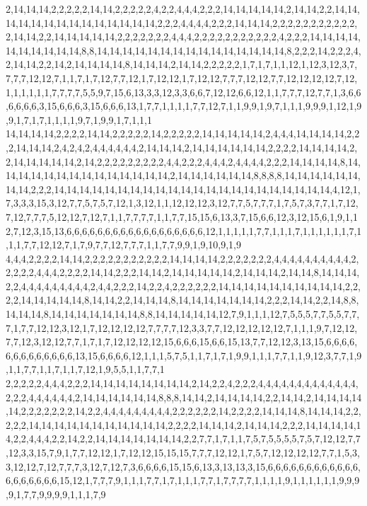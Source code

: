 2,14,14,14,2,2,2,2,2,14,14,2,2,2,2,2,4,2,2,4,4,4,2,2,2,14,14,14,14,14,2,14,14,2,2,14,14,14,14,14,14,14,14,14,14,14,14,14,14,2,2,2,4,4,4,4,2,2,2,14,14,14,2,2,2,2,2,2,2,2,2,2,2,2,14,14,2,2,14,14,14,14,14,2,2,2,2,2,2,2,4,4,4,2,2,2,2,2,2,2,2,2,2,2,4,2,2,2,14,14,14,14,14,14,14,14,14,14,8,8,14,14,14,14,14,14,14,14,14,14,14,14,14,14,14,8,2,2,2,14,2,2,2,4,2,14,14,2,2,14,2,14,14,14,14,8,14,14,14,2,14,14,2,2,2,2,2,1,7,1,7,1,1,12,1,12,3,12,3,7,7,7,7,12,12,7,1,1,7,1,7,12,7,7,12,1,7,12,12,1,7,12,12,7,7,7,12,12,7,7,12,12,12,12,7,12,1,1,1,1,1,1,7,7,7,7,5,5,9,7,15,6,13,3,3,12,3,3,6,6,7,12,12,6,6,12,1,1,7,7,7,12,7,7,1,3,6,6,6,6,6,6,3,15,6,6,6,3,15,6,6,6,13,1,7,7,1,1,1,1,7,7,12,7,1,1,9,9,1,9,7,1,1,1,9,9,9,1,12,1,9,9,1,7,1,7,1,1,1,1,9,7,1,9,9,1,7,1,1,1
14,14,14,14,2,2,2,2,14,14,2,2,2,2,2,14,2,2,2,2,2,14,14,14,14,14,2,4,4,4,14,14,14,14,2,2,2,14,14,14,2,4,2,4,2,4,4,4,4,4,4,2,14,14,14,2,14,14,14,14,14,14,2,2,2,2,14,14,14,14,2,2,14,14,14,14,14,2,14,2,2,2,2,2,2,2,2,2,4,4,2,2,2,4,4,4,2,4,4,4,4,2,2,2,14,14,14,14,8,14,14,14,14,14,14,14,14,14,14,14,14,14,14,2,14,14,14,14,14,14,8,8,8,8,14,14,14,14,14,14,14,14,2,2,2,14,14,14,14,14,14,14,14,14,14,14,14,14,14,14,14,14,14,14,14,14,14,4,12,1,7,3,3,3,15,3,12,7,7,5,7,5,7,12,1,3,12,1,1,12,12,12,3,12,7,7,5,7,7,7,1,7,5,7,3,7,7,1,7,12,7,12,7,7,7,5,12,12,7,12,7,1,1,7,7,7,7,1,1,7,7,15,15,6,13,3,7,15,6,6,12,3,12,15,6,1,9,1,12,7,12,3,15,13,6,6,6,6,6,6,6,6,6,6,6,6,6,6,6,6,6,6,12,1,1,1,1,1,7,7,1,1,1,7,1,1,1,1,1,1,7,1,1,1,7,7,12,12,7,1,7,9,7,7,12,7,7,7,1,1,7,7,9,9,1,9,10,9,1,9
4,4,4,2,2,2,2,14,14,2,2,2,2,2,2,2,2,2,2,2,14,14,14,14,2,2,2,2,2,2,2,4,4,4,4,4,4,4,4,4,4,2,2,2,2,2,4,4,4,2,2,2,2,14,14,2,2,2,14,14,2,14,14,14,14,14,2,14,14,14,2,14,14,8,14,14,14,2,2,4,4,4,4,4,4,4,4,4,2,4,4,2,2,2,14,2,2,4,2,2,2,2,2,2,14,14,14,14,14,14,14,14,14,14,2,2,2,2,14,14,14,14,14,8,14,14,2,2,14,14,14,8,14,14,14,14,14,14,14,2,2,2,14,14,2,2,14,8,8,14,14,14,8,14,14,14,14,14,14,14,8,8,14,14,14,14,14,12,7,9,1,1,1,12,7,5,5,5,7,7,5,5,7,7,7,1,7,7,12,12,3,12,1,7,12,12,12,12,7,7,7,7,12,3,3,7,7,12,12,12,12,12,7,1,1,1,9,7,12,12,7,7,12,3,12,12,7,7,1,7,1,7,12,12,12,12,15,6,6,6,15,6,6,15,13,7,7,12,12,3,13,15,6,6,6,6,6,6,6,6,6,6,6,6,6,13,15,6,6,6,6,12,1,1,1,5,7,5,1,1,7,1,7,1,9,9,1,1,1,7,7,1,1,9,12,3,7,7,1,9,1,1,7,7,1,1,7,1,1,7,12,1,9,5,5,1,1,7,7,1
2,2,2,2,2,4,4,4,2,2,2,14,14,14,14,14,14,14,14,2,14,2,2,4,2,2,2,4,4,4,4,4,4,4,4,4,4,4,4,4,2,2,2,4,4,4,4,4,4,2,14,14,14,14,14,14,8,8,8,14,14,2,14,14,14,14,2,2,14,14,2,14,14,14,14,14,2,2,2,2,2,2,2,14,2,2,4,4,4,4,4,4,4,4,4,2,2,2,2,2,2,14,2,2,2,2,14,14,14,8,14,14,14,2,2,2,2,2,14,14,14,14,14,14,14,14,14,14,14,2,2,2,2,14,14,14,2,14,14,14,2,2,2,14,14,14,14,14,2,2,4,4,4,2,2,14,2,2,14,14,14,14,14,14,14,2,2,7,7,1,7,1,1,7,5,7,5,5,5,5,7,5,7,12,12,7,7,12,3,3,15,7,9,1,7,7,12,12,1,7,12,12,15,15,15,7,7,7,12,12,1,7,5,7,12,12,12,12,7,7,1,5,3,3,12,12,7,12,7,7,7,3,12,7,12,7,3,6,6,6,6,15,15,6,13,3,13,13,3,15,6,6,6,6,6,6,6,6,6,6,6,6,6,6,6,6,6,6,6,15,12,1,7,7,7,9,1,1,1,7,7,1,7,1,1,1,7,7,1,7,7,7,7,1,1,1,1,9,1,1,1,1,1,1,9,9,9,9,1,7,7,9,9,9,9,1,1,1,7,9
